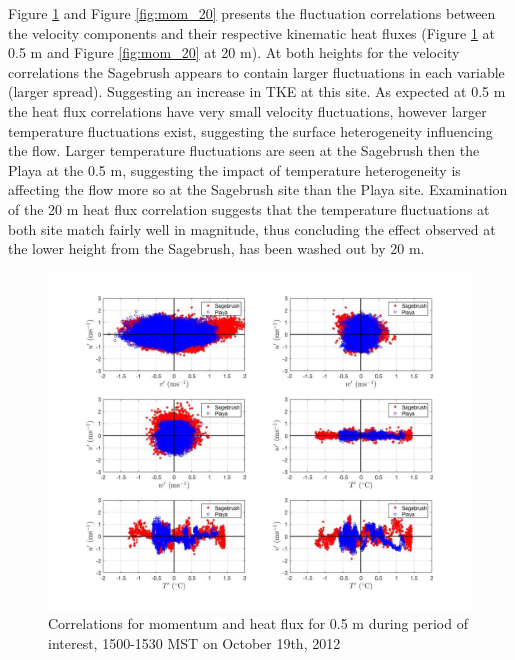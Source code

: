 \documentclass[]{article}
\begin{document}
Figure \ref{fig:mom_05} and Figure \ref{fig:mom_20} presents the fluctuation correlations between the velocity components and their respective kinematic heat fluxes (Figure \ref{fig:mom_05} at 0.5 m and Figure \ref{fig:mom_20} at 20 m). At both heights for the velocity correlations the Sagebrush appears to contain larger fluctuations in each variable (larger spread). Suggesting an increase in TKE at this site. As expected at 0.5 m the heat flux correlations have very small velocity fluctuations, however larger temperature fluctuations exist, suggesting the surface heterogeneity influencing the flow. Larger temperature fluctuations are seen at the Sagebrush then the Playa at the 0.5 m, suggesting the impact of temperature heterogeneity is affecting the flow more so at the Sagebrush site than the Playa site. Examination of the 20 m heat flux correlation suggests that the temperature fluctuations at both site match fairly well in magnitude, thus concluding the effect observed at the lower height from the Sagebrush, has been washed out by 20 m. 
\begin{figure}
	\centering
	\includegraphics[width=\textwidth]{momentum_corr_05m}
		\caption{Correlations for momentum and heat flux for 0.5 m during period of interest, 1500-1530 MST on October 19th, 2012}
	\label{fig:mom_05}
\end{figure}
\end{document}
